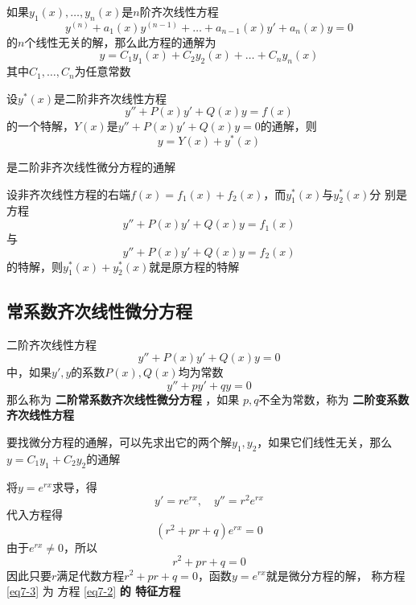 \documentclass[11pt]{article}
\begin{document}
\begin{corollary}[]
如果\(y_1(x),\dots,y_n(x)\)是\(n\)阶齐次线性方程
\begin{equation*}
y^{(n)}+a_1(x)y^{(n-1)}+\dots+a_{n-1}(x)y'+a_n(x)y=0
\end{equation*}
的\(n\)个线性无关的解，那么此方程的通解为
\begin{equation*}
y=C_1y_1(x)+C_2y_2(x)+\dots+C_ny_n(x)
\end{equation*}
其中\(C_1,\dots,C_n\)为任意常数
\end{corollary}

\begin{theorem}[]
设\(y^*(x)\)是二阶非齐次线性方程
\begin{equation*}
y''+P(x)y'+Q(x)y=f(x)
\end{equation*}
的一个特解，\(Y(x)\)是\(y''+P(x)y'+Q(x)y=0\)的通解，则
\begin{equation*}
y=Y(x)+y^*(x)
\end{equation*}


是二阶非齐次线性微分方程的通解
\end{theorem}

\begin{theorem}[叠加原理]
设非齐次线性方程的右端\(f(x)=f_1(x)+f_2(x)\)，而\(y_1^*(x)\)与\(y_2^*(x)\)分
别是方程
\begin{equation*}
y''+P(x)y'+Q(x)y=f_1(x)
\end{equation*}
与
\begin{equation*}
y''+P(x)y'+Q(x)y=f_2(x)
\end{equation*}
的特解，则\(y_1^*(x)+y_2^*(x)\)就是原方程的特解
\end{theorem}
\subsection{常系数齐次线性微分方程}
\label{sec:org5b36ee1}
二阶齐次线性方程
\begin{equation*}
y''+P(x)y'+Q(x)y=0
\end{equation*}
中，如果\(y',y\)的系数\(P(x),Q(x)\)均为常数
\begin{equation}
y''+py'+qy=0\label{eq7-2}
\end{equation}
那么称为 \textbf{二阶常系数齐次线性微分方程} ，如果 \(p,q\)不全为常数，称为 \textbf{二阶变系数
齐次线性方程}

要找微分方程的通解，可以先求出它的两个解\(y_1,y_2\)，如果它们线性无关，那么
\(y=C_1y_1+C_2y_2\)的通解

将\(y=e^{rx}\)求导，得
\begin{equation*}
y'=re^{rx},\quad y''=r^2e^{rx}
\end{equation*}
代入方程得
\begin{equation*}
(r^2+pr+q)e^{rx}=0
\end{equation*}
由于\(e^{rx}\neq0\)，所以
\begin{equation}
r^2+pr+q=0\label{eq7-3}
\end{equation}
因此只要\(r\)满足代数方程\(r^2+pr+q=0\)，函数\(y=e^{rx}\)就是微分方程的解，
称方程 \eqref{eq7-3}
为 方程 \eqref{eq7-2} \textbf{的 特征方程}
\end{document}
